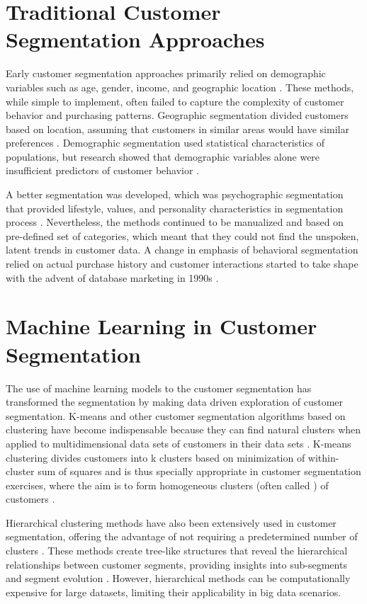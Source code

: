 \documentclass[12pt,a4paper]{report}
\begin{document}
\section{Traditional Customer Segmentation Approaches}
Early customer segmentation approaches primarily relied on demographic variables such as age, gender, income, and geographic location \cite{kotler2016}. These methods, while simple to implement, often failed to capture the complexity of customer behavior and purchasing patterns. Geographic segmentation divided customers based on location, assuming that customers in similar areas would have similar preferences \cite{wedel2000}. Demographic segmentation used statistical characteristics of populations, but research showed that demographic variables alone were insufficient predictors of customer behavior \cite{yankelovich1964}.

\noindent
A better segmentation was developed, which was psychographic segmentation that provided lifestyle, values, and personality characteristics in segmentation process \cite{plummer1974}. Nevertheless, the methods continued to be manualized and based on pre-defined set of categories, which meant that they could not find the unspoken, latent trends in customer data. A change in emphasis of behavioral segmentation relied on actual purchase history and customer interactions started to take shape with the advent of database marketing in 1990s \cite{blattberg2008}.

\section{Machine Learning in Customer Segmentation}
The use of machine learning models to the customer segmentation has transformed the segmentation by making data driven exploration of customer segmentation. K-means and other customer segmentation algorithms based on clustering have become indispensable because they can find natural clusters when applied to multidimensional data sets of customers in their data sets \cite{jain2010}. K-means clustering divides customers into k clusters based on minimization of within-cluster sum of squares and is thus specially appropriate in customer segmentation exercises, where the aim is to form homogeneous clusters (often called ) of customers \cite{macqueen1967}.

\noindent
Hierarchical clustering methods have also been extensively used in customer segmentation, offering the advantage of not requiring a predetermined number of clusters \cite{kaufman2009}. These methods create tree-like structures that reveal the hierarchical relationships between customer segments, providing insights into sub-segments and segment evolution \cite{murtagh2012}. However, hierarchical methods can be computationally expensive for large datasets, limiting their applicability in big data scenarios.
\end{document}
